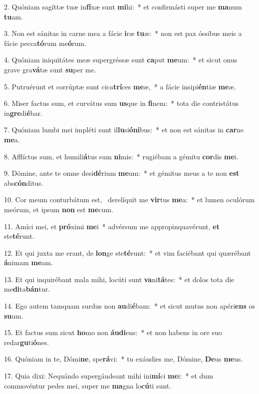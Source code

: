 2. Quóniam sagíttæ tuæ in\textbf{fí}xæ sunt \textbf{mi}hi:~*  et confirmásti super me \textbf{ma}num \textbf{tu}am.\

3. Non est sánitas in carne mea a fácie \textbf{i}ræ \textbf{tu}æ:~*  non est pax óssibus meis a fácie pecca\textbf{tó}rum me\textbf{ó}rum.\

4. Quóniam iniquitátes meæ supergréssæ sunt \textbf{ca}put \textbf{me}um:~*  et sicut onus grave gra\textbf{vá}tæ sunt \textbf{su}per me.\

5. Putruérunt et corrúptæ sunt cica\textbf{trí}ces \textbf{me}æ,~*  a fácie insipi\textbf{én}tiæ \textbf{me}æ.\

6. Miser factus sum, et curvátus sum \textbf{us}que in \textbf{fi}nem:~*  tota die contristátus in\textbf{gre}di\textbf{é}bar.\

7. Quóniam lumbi mei impléti sunt il\textbf{lu}si\textbf{ó}\textbf{ni}bus:~*  et non est sánitas in \textbf{car}ne \textbf{me}a.\

8. Afflíctus sum, et humili\textbf{á}tus sum \textbf{ni}mis:~*  rugiébam a gémitu \textbf{cor}dis \textbf{me}i.\

9. Dómine, ante te omne desi\textbf{dé}rium \textbf{me}um:~*  et gémitus meus a te non \textbf{est} abs\textbf{cón}ditus.\

10. Cor meum conturbátum est, \dag\  derelíquit me \textbf{vir}tus \textbf{me}a:~*  et lumen oculórum meórum, et ipsum \textbf{non} est \textbf{me}cum.\

11. Amíci mei, et \textbf{pró}ximi \textbf{me}i~*  advérsum me appropinquavérunt, \textbf{et} ste\textbf{té}runt.\

12. Et qui juxta me erant, de \textbf{lon}ge ste\textbf{té}runt:~*  et vim faciébant qui quærébant \textbf{á}nimam \textbf{me}am.\

13. Et qui inquirébant mala mihi, locúti sunt \textbf{va}ni\textbf{tá}tes:~*  et dolos tota die me\textbf{di}ta\textbf{bán}tur.\

14. Ego autem tamquam surdus non \textbf{au}di\textbf{é}bam:~*  et sicut mutus non apéri\textbf{ens} os \textbf{su}um.\

15. Et factus sum sicut \textbf{ho}mo non \textbf{áu}\textbf{di}ens:~*  et non habens in ore suo redar\textbf{gu}ti\textbf{ó}nes.\

16. Quóniam in te, Dómi\textbf{ne}, spe\textbf{rá}vi:~*  tu exáudies me, Dómine, \textbf{De}us \textbf{me}us.\

17. Quia dixi: Nequándo supergáudeant mihi ini\textbf{mí}ci \textbf{me}i:~*  et dum commovéntur pedes mei, super me \textbf{ma}gna lo\textbf{cú}ti sunt.\

